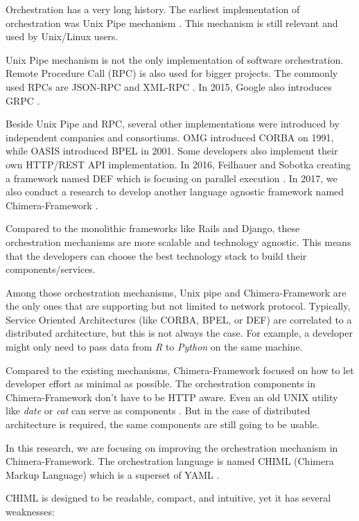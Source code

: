 \documentclass[conference]{IEEEtran}
\begin{document}
Orchestration has a very long history. The earliest implementation of orchestration was Unix Pipe mechanism \cite{mcilroy1968mass}. This mechanism is still relevant and used by Unix/Linux users.

Unix Pipe mechanism is not the only implementation of software orchestration. Remote Procedure Call (RPC) is also used for bigger projects. The commonly used RPCs are JSON-RPC \cite{jsonrpc} and XML-RPC \cite{xmlrpc}. In 2015, Google also introduces GRPC \cite{grpc}.

Beside Unix Pipe and RPC, several other implementations were introduced by independent companies and consortiums. OMG introduced CORBA on 1991, while OASIS introduced BPEL in 2001. Some developers also implement their own HTTP/REST API implementation. In 2016, Feilhauer and Sobotka creating a framework named DEF which is focusing on parallel execution \cite{feilhauer2016def}. In 2017, we also conduct a research to develop another language agnostic framework named Chimera-Framework \cite{gunawan2017chimera}.

Compared to the monolithic frameworks like Rails and Django, these orchestration mechanisms are more scalable and technology agnostic. This means that the developers can choose the best technology stack to build their components/services.

Among those orchestration mechanisms, Unix pipe and Chimera-Framework are the only ones that are supporting but not limited to network protocol. Typically, Service Oriented Architectures (like CORBA, BPEL, or DEF) are correlated to a distributed architecture, but this is not always the case. For example, a developer might only need to pass data from {\it R } to {\it Python } on the same machine.

Compared to the existing mechanisms, Chimera-Framework focused on how to let developer effort as minimal as possible. The orchestration components in Chimera-Framework don't have to be HTTP aware. Even an old UNIX utility like {\it date} or {\it cat} can serve as components \cite{gunawan2017chimera}. But in the case of distributed architecture is required, the same components are still going to be usable.

In this research, we are focusing on improving the orchestration mechanism in Chimera-Framework. The orchestration language is named CHIML (Chimera Markup Language) which is a superset of YAML \cite{yaml}.

CHIML is designed to be readable, compact, and intuitive, yet it has several weaknesses:
\end{document}
